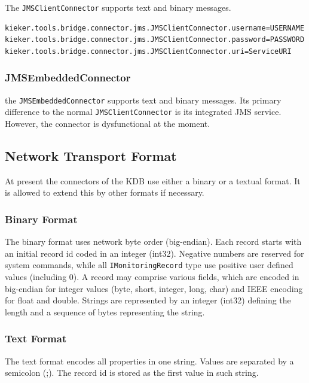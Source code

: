 \documentclass[11pt,a4paper]{article}
\begin{document}
The \texttt{JMSClientConnector} supports text and binary messages.

\begin{verbatim}
kieker.tools.bridge.connector.jms.JMSClientConnector.username=USERNAME
kieker.tools.bridge.connector.jms.JMSClientConnector.password=PASSWORD
kieker.tools.bridge.connector.jms.JMSClientConnector.uri=ServiceURI
\end{verbatim}

%
\subsubsection{JMSEmbeddedConnector}

the \texttt{JMSEmbeddedConnector} supports text and binary messages. Its primary difference to the normal \texttt{JMSClientConnector} is its integrated JMS service. However, the connector is dysfunctional at the moment.

%
\subsection{Network Transport Format}

At present the connectors of the KDB use either a binary or a textual format. It is allowed to extend this by other formats if necessary.

%
\subsubsection{Binary Format}

The binary format uses network byte order (big-endian). Each record starts with an initial record id coded in an integer (int32). Negative numbers are reserved for system commands, while all \texttt{IMonitoringRecord} type use positive user defined values (including 0). A record may comprise various fields, which are encoded in big-endian for integer values (byte, short, integer, long, char) and IEEE encoding for float and double. Strings are represented by an integer (int32) defining the length and a sequence of bytes representing the string.

%
\subsubsection{Text Format}

The text format encodes all properties in one string. Values are separated by a semicolon (;). The record id is stored as the first value in such string.
\end{document}
